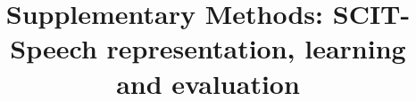 \documentclass[final,5p,times,twocolumn]{elsarticle}
\begin{document}
\begin{frontmatter}
\title{Supplementary Methods: SCIT-Speech representation, learning and evaluation}
\end{frontmatter}


\FloatBarrier
{\small

}
\end{document}
